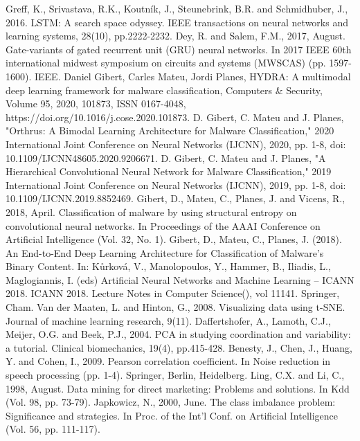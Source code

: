 \documentclass[conference]{IEEEtran}
\begin{document}
\begin{thebibliography}{00}
 Greff, K., Srivastava, R.K., Koutník, J., Steunebrink, B.R. and Schmidhuber, J., 2016. LSTM: A search space odyssey. IEEE transactions on neural networks and learning systems, 28(10), pp.2222-2232.
 Dey, R. and Salem, F.M., 2017, August. Gate-variants of gated recurrent unit (GRU) neural networks. In 2017 IEEE 60th international midwest symposium on circuits and systems (MWSCAS) (pp. 1597-1600). IEEE.
 Daniel Gibert, Carles Mateu, Jordi Planes, HYDRA: A multimodal deep learning framework for malware classification, Computers \& Security, Volume 95, 2020, 101873, ISSN 0167-4048, https://doi.org/10.1016/j.cose.2020.101873.
 D. Gibert, C. Mateu and J. Planes, "Orthrus: A Bimodal Learning Architecture for Malware Classification," 2020 International Joint Conference on Neural Networks (IJCNN), 2020, pp. 1-8, doi: 10.1109/IJCNN48605.2020.9206671.
 D. Gibert, C. Mateu and J. Planes, "A Hierarchical Convolutional Neural Network for Malware Classification," 2019 International Joint Conference on Neural Networks (IJCNN), 2019, pp. 1-8, doi: 10.1109/IJCNN.2019.8852469.
 Gibert, D., Mateu, C., Planes, J. and Vicens, R., 2018, April. Classification of malware by using structural entropy on convolutional neural networks. In Proceedings of the AAAI Conference on Artificial Intelligence (Vol. 32, No. 1).
 Gibert, D., Mateu, C., Planes, J. (2018). An End-to-End Deep Learning Architecture for Classification of Malware’s Binary Content. In: Kůrková, V., Manolopoulos, Y., Hammer, B., Iliadis, L., Maglogiannis, I. (eds) Artificial Neural Networks and Machine Learning – ICANN 2018. ICANN 2018. Lecture Notes in Computer Science(), vol 11141. Springer, Cham.
 Van der Maaten, L. and Hinton, G., 2008. Visualizing data using t-SNE. Journal of machine learning research, 9(11).
 Daffertshofer, A., Lamoth, C.J., Meijer, O.G. and Beek, P.J., 2004. PCA in studying coordination and variability: a tutorial. Clinical biomechanics, 19(4), pp.415-428.
 Benesty, J., Chen, J., Huang, Y. and Cohen, I., 2009. Pearson correlation coefficient. In Noise reduction in speech processing (pp. 1-4). Springer, Berlin, Heidelberg.
 Ling, C.X. and Li, C., 1998, August. Data mining for direct marketing: Problems and solutions. In Kdd
(Vol. 98, pp. 73-79).
 Japkowicz, N., 2000, June. The class imbalance problem: Significance and strategies. In Proc. of the
Int’l Conf. on Artificial Intelligence (Vol. 56, pp. 111-117).

\end{thebibliography}
\end{document}
